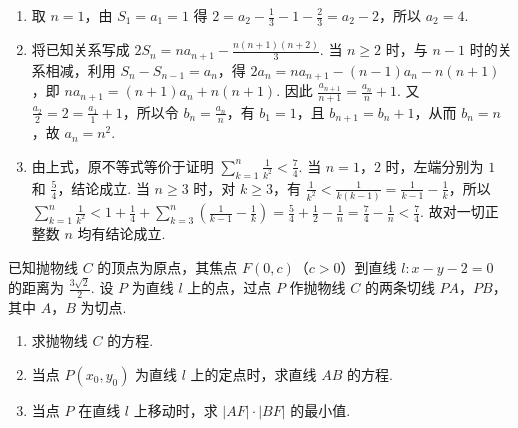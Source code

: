 \begin{solution}
\begin{enumerate}
\item 取 \(n=1\)，由 \(S_1=a_1=1\) 得 \(2=a_2-\frac13-1-\frac23=a_2-2\)，所以 \(a_2=4\).
\item 将已知关系写成 \(2S_n=na_{n+1}-\frac{n(n+1)(n+2)}3\). 当 \(n\geqslant2\) 时，与 \(n-1\) 时的关系相减，利用 \(S_n-S_{n-1}=a_n\)，得
\(2a_n=na_{n+1}-(n-1)a_n-n(n+1)\)，即 \(na_{n+1}=(n+1)a_n+n(n+1)\). 因此 \(\frac{a_{n+1}}{n+1}=\frac{a_n}{n}+1\). 又 \(\frac{a_2}{2}=2=\frac{a_1}{1}+1\)，所以令 \(b_n=\frac{a_n}{n}\)，有 \(b_1=1\)，且 \(b_{n+1}=b_n+1\)，从而 \(b_n=n\)，故 \(a_n=n^2\).
\item 由上式，原不等式等价于证明 \(\sum_{k=1}^n\frac1{k^2}<\frac74\). 当 \(n=1\)，\(2\) 时，左端分别为 \(1\) 和 \(\frac54\)，结论成立. 当 \(n\geqslant3\) 时，对 \(k\geqslant3\)，有 \(\frac1{k^2}<\frac1{k(k-1)}=\frac1{k-1}-\frac1k\)，所以
\(\sum_{k=1}^n\frac1{k^2}<1+\frac14+\sum_{k=3}^n\left(\frac1{k-1}-\frac1k\right)=\frac54+\frac12-\frac1n=\frac74-\frac1n<\frac74\). 故对一切正整数 \(n\) 均有结论成立.
\end{enumerate}
\end{solution}

\begin{problem}
已知抛物线 \(C\) 的顶点为原点，其焦点 \(F(0, c)\)（\(c > 0\)）到直线 \(l: x - y - 2 = 0\) 的距离为 \(\frac{3\sqrt{2}}{2}\). 设 \(P\) 为直线 \(l\) 上的点，过点 \(P\) 作抛物线 \(C\) 的两条切线 \(PA\)，\(PB\)，其中 \(A\)，\(B\) 为切点.

\begin{enumerate}
\item 求抛物线 \(C\) 的方程.
\item 当点 \(P(x_0, y_0)\) 为直线 \(l\) 上的定点时，求直线 \(AB\) 的方程.
\item 当点 \(P\) 在直线 \(l\) 上移动时，求 \(|AF| \cdot |BF|\) 的最小值.
\end{enumerate}
\end{problem}

